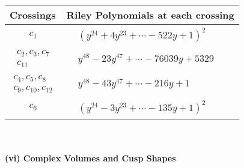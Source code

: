 \documentclass[1p]{elsarticle_modified}
\theoremstyle{definition}
\begin{document}
\begin{tabular}{m{50pt}|m{274pt}}
Crossings & \hspace{64pt}Riley Polynomials at each crossing \\
\hline $$\begin{aligned}c_{1}\end{aligned}$$&$\begin{aligned}
&(y^{24}+4 y^{23}+\cdots-522 y+1)^{2}
\end{aligned}$\\
\hline $$\begin{aligned}c_{2},c_{3},c_{7}\\c_{11}\end{aligned}$$&$\begin{aligned}
&y^{48}-23 y^{47}+\cdots-76039 y+5329
\end{aligned}$\\
\hline $$\begin{aligned}c_{4},c_{5},c_{8}\\c_{9},c_{10},c_{12}\end{aligned}$$&$\begin{aligned}
&y^{48}-43 y^{47}+\cdots-216 y+1
\end{aligned}$\\
\hline $$\begin{aligned}c_{6}\end{aligned}$$&$\begin{aligned}
&(y^{24}-3 y^{23}+\cdots-135 y+1)^{2}
\end{aligned}$\\
\hline
\end{tabular}\\~\\
\newpage\flushleft \textbf{(vi) Complex Volumes and Cusp Shapes}
\end{document}
